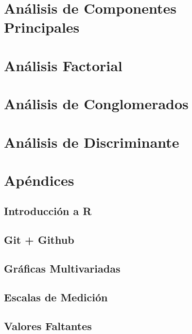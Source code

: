 \documentclass[
]{book}
\begin{document}
\chapter{Análisis de Componentes Principales}\label{anuxe1lisis-de-componentes-principales}

\chapter{Análisis Factorial}\label{anuxe1lisis-factorial}

\chapter{Análisis de Conglomerados}\label{anuxe1lisis-de-conglomerados}

\chapter{Análisis de Discriminante}\label{anuxe1lisis-de-discriminante}

\chapter{Apéndices}\label{apuxe9ndices}

\section{Introducción a R}\label{introducciuxf3n-a-r}

\section{Git + Github}\label{git-github}

\section{Gráficas Multivariadas}\label{gruxe1ficas-multivariadas}

\section{Escalas de Medición}\label{escalas-de-mediciuxf3n}

\section{Valores Faltantes}\label{valores-faltantes}

  
\end{document}
